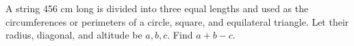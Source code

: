 A string 456 cm long is divided into three equal lengths and used as the circumferences or perimeters of a circle, square, and equilateral triangle. Let their radius, diagonal, and altitude be $a,b,c$. Find $a+b-c$.
